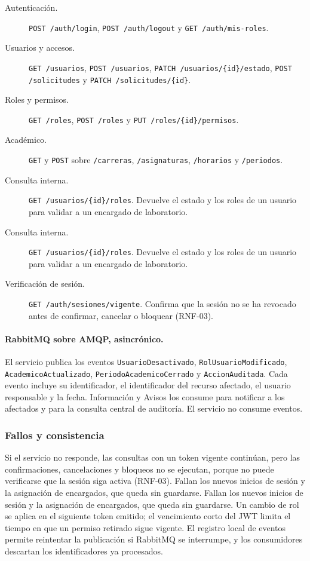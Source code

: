 \begin{description}
    \item[Autenticación.] \texttt{POST /auth/login},
    \texttt{POST /auth/logout} y \texttt{GET /auth/mis-roles}.
    \item[Usuarios y accesos.] \texttt{GET /usuarios},
    \texttt{POST /usuarios}, \texttt{PATCH /usuarios/\{id\}/estado},
    \texttt{POST /solicitudes} y \texttt{PATCH /solicitudes/\{id\}}.
    \item[Roles y permisos.] \texttt{GET /roles}, \texttt{POST /roles} y
    \texttt{PUT /roles/\{id\}/permisos}.
    \item[Académico.] \texttt{GET} y \texttt{POST} sobre
    \texttt{/carreras}, \texttt{/asignaturas}, \texttt{/horarios} y
    \texttt{/periodos}.
    \item[Consulta interna.] \texttt{GET /usuarios/\{id\}/roles}. Devuelve
    el estado y los roles de un usuario para validar a un encargado de
    laboratorio.
        \item[Consulta interna.] \texttt{GET /usuarios/\{id\}/roles}. Devuelve
    el estado y los roles de un usuario para validar a un encargado de
    laboratorio.
    \item[Verificación de sesión.] \texttt{GET /auth/sesiones/vigente}.
    Confirma que la sesión no se ha revocado antes de confirmar, cancelar
    o bloquear (RNF-03).
\end{description}

\paragraph{RabbitMQ sobre AMQP, asincrónico.}
El servicio publica los eventos \texttt{UsuarioDesactivado},
\texttt{RolUsuarioModificado}, \texttt{AcademicoActualizado},
\texttt{PeriodoAcademicoCerrado} y \texttt{AccionAuditada}. Cada evento incluye su identificador, el
identificador del recurso afectado, el usuario responsable y la fecha.
Información y Avisos los consume para notificar a los afectados y para la
consulta central de auditoría. El servicio no consume eventos.

\subsubsection{Fallos y consistencia}

Si el servicio no responde, las consultas con un token vigente continúan,
pero las confirmaciones, cancelaciones y bloqueos no se ejecutan, porque
no puede verificarse que la sesión siga activa (RNF-03). Fallan los nuevos
inicios de sesión y la asignación de encargados, que queda sin guardarse. Fallan los nuevos
inicios de sesión y la asignación de encargados, que queda sin guardarse.
Un cambio de rol se aplica en el siguiente token emitido; el vencimiento
corto del JWT limita el tiempo en que un permiso retirado sigue vigente.
El registro local de eventos permite reintentar la publicación si
RabbitMQ se interrumpe, y los consumidores descartan los identificadores
ya procesados.